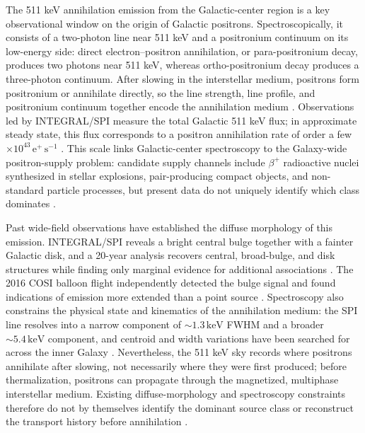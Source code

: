 \documentclass[pdflatex,sn-mathphys-num]{sn-jnl}
\newcommand{\keV}{\,\mathrm{keV}}
\begin{document}
The 511 keV annihilation emission from the Galactic-center region is a key observational window on the origin of Galactic positrons. Spectroscopically, it consists of a two-photon line near 511 keV and a positronium continuum on its low-energy side: direct electron--positron annihilation, or para-positronium decay, produces two photons near 511 keV, whereas ortho-positronium decay produces a three-photon continuum. After slowing in the interstellar medium, positrons form positronium or annihilate directly, so the line strength, line profile, and positronium continuum together encode the annihilation medium \cite{Prantzos2011,Jean2006}. Observations led by INTEGRAL/SPI measure the total Galactic 511 keV flux; in approximate steady state, this flux corresponds to a positron annihilation rate of order a few $\times10^{43}\,\mathrm{e^+\,s^{-1}}$ \cite{Prantzos2011,Kierans2020}. This scale links Galactic-center spectroscopy to the Galaxy-wide positron-supply problem: candidate supply channels include $\beta^+$ radioactive nuclei synthesized in stellar explosions, pair-producing compact objects, and non-standard particle processes, but present data do not uniquely identify which class dominates \cite{Prantzos2011,Siegert2016AA}.

Past wide-field observations have established the diffuse morphology of this emission. INTEGRAL/SPI reveals a bright central bulge together with a fainter Galactic disk, and a 20-year analysis recovers central, broad-bulge, and disk structures while finding only marginal evidence for additional associations \cite{Siegert2016AA,Yoneda2025}. The 2016 COSI balloon flight independently detected the bulge signal and found indications of emission more extended than a point source \cite{Kierans2020,Siegert2020COSI}. Spectroscopy also constrains the physical state and kinematics of the annihilation medium: the SPI line resolves into a narrow component of $\sim 1.3\keV$ FWHM and a broader $\sim 5.4\keV$ component, and centroid and width variations have been searched for across the inner Galaxy \cite{Jean2006,Siegert2019Kinematics}. Nevertheless, the 511 keV sky records where positrons annihilate after slowing, not necessarily where they were first produced; before thermalization, positrons can propagate through the magnetized, multiphase interstellar medium. Existing diffuse-morphology and spectroscopy constraints therefore do not by themselves identify the dominant source class or reconstruct the transport history before annihilation \cite{Prantzos2011}.
\end{document}
